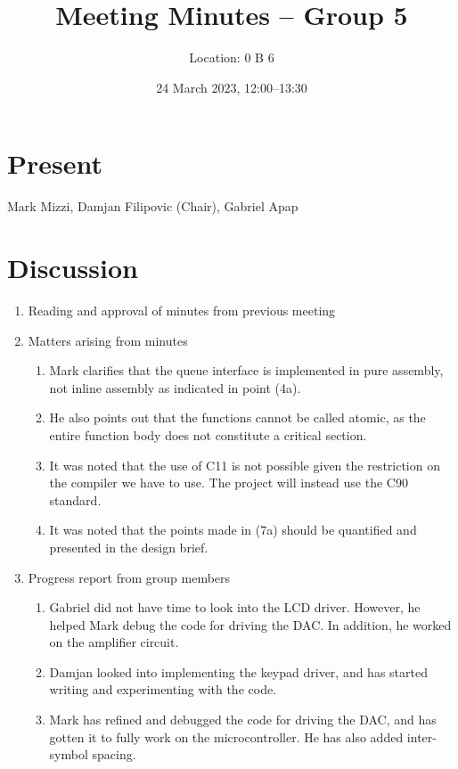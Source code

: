 \documentclass[11pt,a4paper]{scrartcl}
\title{Meeting Minutes -- Group 5}
\author{Location: 0 B 6}
\date{24 March 2023, 12:00--13:30}
\begin{document}
\maketitle

\section*{Present}
Mark Mizzi,
Damjan Filipovic (Chair),
Gabriel Apap

\section*{Discussion}

\begin{enumerate}

   \item Reading and approval of minutes from previous meeting

   \item Matters arising from minutes
    \begin{enumerate}
        \item Mark clarifies that the queue interface is implemented in pure assembly, not inline assembly as indicated in point (4a).
        \item He also points out that the functions cannot be called atomic, as the entire function body does not constitute a critical section.
        \item It was noted that the use of C11 is not possible given the restriction on the compiler we have to use. The project will instead use the C90 standard.
        \item It was noted that the points made in (7a) should be quantified and presented in the design brief.
    \end{enumerate}
   
   \item Progress report from group members
      \begin{enumerate}
         \item Gabriel did not have time to look into the LCD driver. However, he helped Mark debug the code for driving the DAC. In addition, he worked on the amplifier circuit.

         \item Damjan looked into implementing the keypad driver, and has started writing and experimenting with the code.

         \item Mark has refined and debugged the code for driving the DAC, and has gotten it to fully work on the microcontroller. He has also added inter-symbol spacing.
      \end{enumerate}
   

\end{enumerate}
\end{document}
